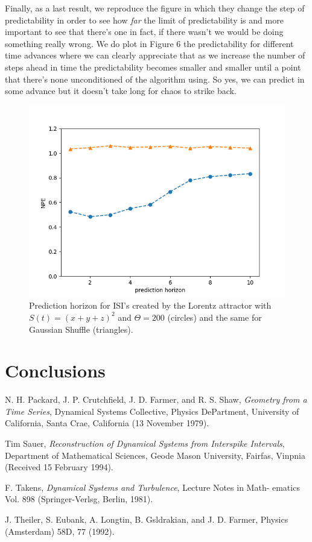 \documentclass[10pt]{article}
\begin{document}
Finally, as a last result, we reproduce the figure in which they change the step of predictability in order to see how \textit{far} the limit of predictability is and more important to see that there's one in fact, if there wasn't we would be doing something really wrong. We do plot in Figure 6 the predictability for different time advances where we can clearly appreciate that as we increase the number of steps ahead in time the predictability becomes smaller and smaller until a point that there's none unconditioned of the algorithm using. So yes, we can predict in some advance but it doesn't take long for chaos to strike back.

\begin{figure}[h!]
\centering
\includegraphics[scale=0.5]{prediction}
\caption{Prediction horizon for ISI's created by the Lorentz attractor with $S(t)=(x+y+z)^2$ and $\Theta = 200$ (circles) and the same for Gaussian Shuffle (triangles). }
\label{fig:distributions}
\end{figure}

\section{Conclusions}

\begin{thebibliography}{99}
 
N. H. Packard, J. P. Crutchfield, J. D. Farmer, and R. S. Shaw, {\it Geometry from a Time Series}, Dynamical Systems Collective, Physics DePartment, University of California, Santa Crae, California (13 November 1979).

Tim Sauer, {\it Reconstruction of Dynamical Systems from Interspike Intervals}, Department of Mathematical Sciences, Geode Mason University, Fairfas, Vinpnia (Received 15 February 1994).

F. Takens, {\it Dynamical Systems and Turbulence}, Lecture Notes in Math-
ematics Vol. 898 (Springer-Verlsg, Berlin, 1981).

J. Theiler, S. Eubank, A. Longtin, B. Gsldrakian, and
J. D. Farmer, Physics (Amsterdam) 58D, 77 (1992).

\end{thebibliography}
\end{document}
